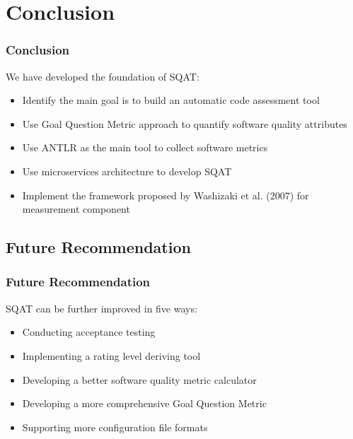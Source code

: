 \section{Conclusion}

\begin{frame}
\frametitle{Conclusion}
We have developed the foundation of SQAT:
\begin{itemize}
  \item Identify the main goal is to build an automatic code assessment tool
  \item Use Goal Question Metric approach to quantify software quality attributes
  \item Use ANTLR as the main tool to collect software metrics
  \item Use microservices architecture to develop SQAT
  \item Implement the framework proposed by Washizaki et al. (2007) for measurement component
\end{itemize}

\end{frame}

\subsection{Future Recommendation}
\begin{frame}
\frametitle{Future Recommendation}

SQAT can be further improved in five ways:
\begin{itemize}
  \item Conducting acceptance testing
  \item Implementing a rating level deriving tool
  \item Developing a better software quality metric calculator
  \item Developing a more comprehensive Goal Question Metric
  \item Supporting more configuration file formats
\end{itemize}

\end{frame}

